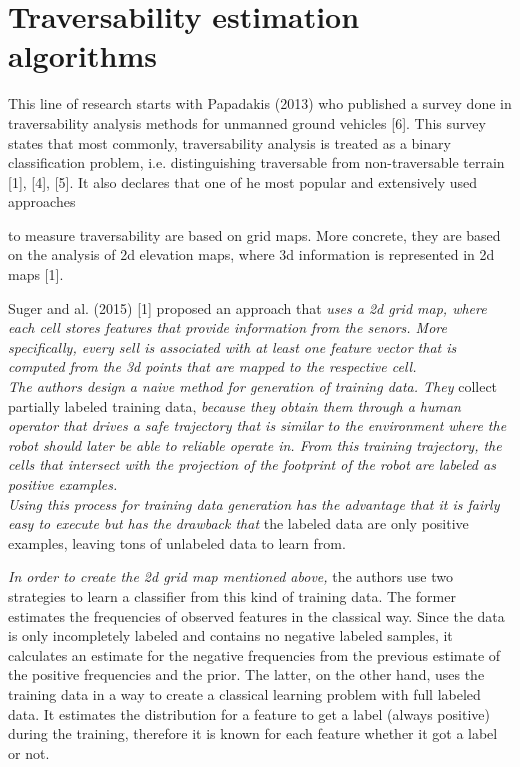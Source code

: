 \documentclass[12pt,a4paper]{report}
\begin{document}
\section{Traversability estimation algorithms}
	
This line of research starts with Papadakis (2013)
who published a survey done in traversability analysis methods for
unmanned ground vehicles [6]. This survey states that most commonly,
traversability analysis is treated as a binary classification problem,
i.e. distinguishing traversable from non-traversable terrain [1], [4],
[5]. It also declares that one of he most popular and extensively used
approaches
        
	to measure traversability are based on grid 
	maps. More concrete, they are based on the analysis of 2d elevation maps, 
	where 3d information is represented in 2d maps [1].
	
	Suger and al. (2015) [1] proposed an approach that \textit{uses a 2d grid map, where 
	each cell stores features that provide information from the senors. More 
	specifically, every sell is associated with at least one feature vector that is 
	computed from the 3d points that are mapped to the respective cell.
	\\
	The authors design a naive method for generation of training data. They} 
	collect partially labeled training data, \textit{because they obtain them through a 
	human operator that drives a safe trajectory that is similar to the 
	environment where the robot should later be able to reliable operate	in. From this 
	training trajectory, the cells that intersect with the projection of the footprint 
	of the robot are labeled as positive examples. 
	\\
	Using this process for training data generation has the advantage that it 
	is fairly easy to execute but has the drawback that} the labeled data are only 
	positive examples, leaving tons of unlabeled data to learn from.
	
	\textit{In order to create the 2d grid map mentioned above,} the authors use two strategies to learn a classifier from this kind of 
	training data. The former estimates the frequencies of observed	features in the 
	classical way. Since the data is only incompletely labeled and contains no 
	negative labeled samples, it calculates an estimate for the negative 
	frequencies from the previous estimate of the positive frequencies and the prior. The 
	latter, on the other hand, uses the training data in a way to create a classical 
	learning problem with full labeled data. It estimates the distribution for a 
	feature to get a label (always positive) during the training, therefore it is 
	known for each feature whether it got a label or not.
	\newline
	
\end{document}
